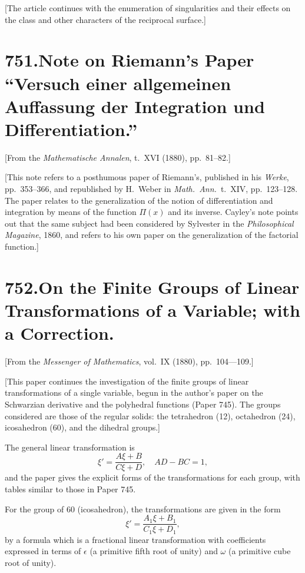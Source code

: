 \documentclass[11pt,a4paper]{book}
\begin{document}
[The article continues with the enumeration of singularities and their effects on the class and other characters of the reciprocal surface.]


\newpage
\section*{\textbf{751.}\quad Note on Riemann's Paper ``Versuch einer allgemeinen Auffassung der Integration und Differentiation.''}

[From the \textit{Mathematische Annalen}, t.~XVI (1880), pp.~81--82.]

\medskip

[This note refers to a posthumous paper of Riemann's, published in his \textit{Werke}, pp.~353--366, and republished by H.~Weber in \textit{Math.\ Ann.}\ t.~XIV, pp.~123--128. The paper relates to the generalization of the notion of differentiation and integration by means of the function $\Pi(x)$ and its inverse. Cayley's note points out that the same subject had been considered by Sylvester in the \textit{Philosophical Magazine}, 1860, and refers to his own paper on the generalization of the factorial function.]


\newpage
\section*{\textbf{752.}\quad On the Finite Groups of Linear Transformations of a Variable; with a Correction.}

[From the \textit{Messenger of Mathematics}, vol.~IX (1880), pp.~104---109.]

\medskip

[This paper continues the investigation of the finite groups of linear transformations of a single variable, begun in the author's paper on the Schwarzian derivative and the polyhedral functions (Paper 745). The groups considered are those of the regular solids: the tetrahedron (12), octahedron (24), icosahedron (60), and the dihedral groups.]

The general linear transformation is
\[
\xi' = \frac{A\xi + B}{C\xi + D},\quad AD - BC = 1,
\]
and the paper gives the explicit forms of the transformations for each group, with tables similar to those in Paper 745.

For the group of 60 (icosahedron), the transformations are given in the form
\[
\xi' = \frac{A_1\xi + B_1}{C_1\xi + D_1},
\]
by a formula which is a fractional linear transformation with coefficients expressed in terms of $\epsilon$ (a primitive fifth root of unity) and $\omega$ (a primitive cube root of unity).
\end{document}

